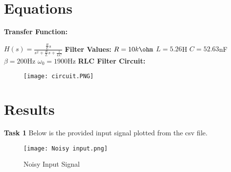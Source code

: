 \documentclass[12pt]{report}
\begin{document}
\section{Equations}
\textbf{Transfer Function:}

$H(s) = \frac{\frac{R}{L}s}{s^2 + \frac{R}{L}s + \frac{1}{LC}}$  \newline\newline 
\textbf{Filter Values:}\newline\newline 
$R = 10k\ohm $\newline
$L = 5.26$H\newline
$C = 52.63$nF\newline
$\beta = 200$Hz\newline
$\omega_0 =1900 $Hz\newline \newline 
\textbf{RLC Filter Circuit:} \newline 
\begin{figure}[h!]
    \texttt{[image: circuit.PNG]}
    \label{Task 1 - Input Signal}
\end{figure}
\newpage 
\section{Results}
\textbf{Task 1}\newline 
Below is the provided input signal plotted from the csv file. 
\begin{figure}[h!]
    \centering
    \texttt{[image: Noisy input.png]}
    \caption{Noisy Input Signal }
    \label{Task 1}
\end{figure}\newpage 
\end{document}
